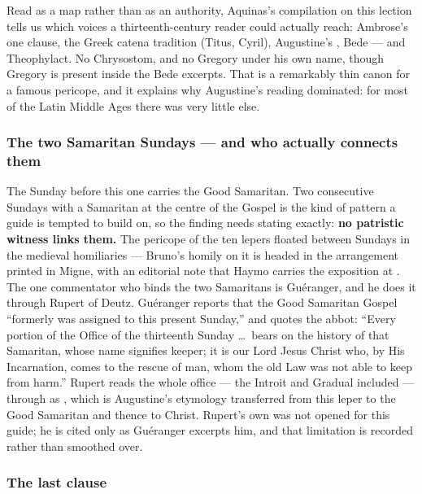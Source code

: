 Read as a map rather than as an authority, Aquinas's compilation on this
lection tells us which voices a thirteenth-century reader could actually
reach: Ambrose's one clause, the Greek catena tradition (Titus, Cyril),
Augustine's , Bede --- and Theophylact. No Chrysostom, and no
Gregory under his own name, though Gregory is present inside the Bede
excerpts. That is a remarkably thin canon for a famous pericope, and it
explains why Augustine's reading dominated: for most of the Latin Middle Ages
there was very little else.

\subsubsection*{The two Samaritan Sundays --- and who actually connects them}

The Sunday before this one carries the Good Samaritan. Two consecutive
Sundays with a Samaritan at the centre of the Gospel is the kind of pattern a
guide is tempted to build on, so the finding needs stating exactly: \textbf{no
patristic witness links them.} The pericope of the ten lepers floated between
Sundays in the medieval homiliaries --- Bruno's homily on it is headed
 in the arrangement printed in Migne, with
an editorial note that Haymo carries the exposition at .
The one commentator who binds the two Samaritans is Guéranger, and he does it
through Rupert of Deutz. Guéranger reports that the Good Samaritan Gospel
``formerly was assigned to this present Sunday,'' and quotes the abbot: ``Every
portion of the Office of the thirteenth Sunday \dots\ bears on the history of
that Samaritan, whose name signifies keeper; it is our Lord Jesus Christ who,
by His Incarnation, comes to the rescue of man, whom the old Law was not able
to keep from harm.'' Rupert reads the whole office --- the Introit and Gradual
included --- through  as , which is
Augustine's etymology transferred from this leper to the Good Samaritan and
thence to Christ. Rupert's own  was not opened for
this guide; he is cited only as Guéranger excerpts him, and that limitation is
recorded rather than smoothed over.

\subsubsection*{The last clause}

